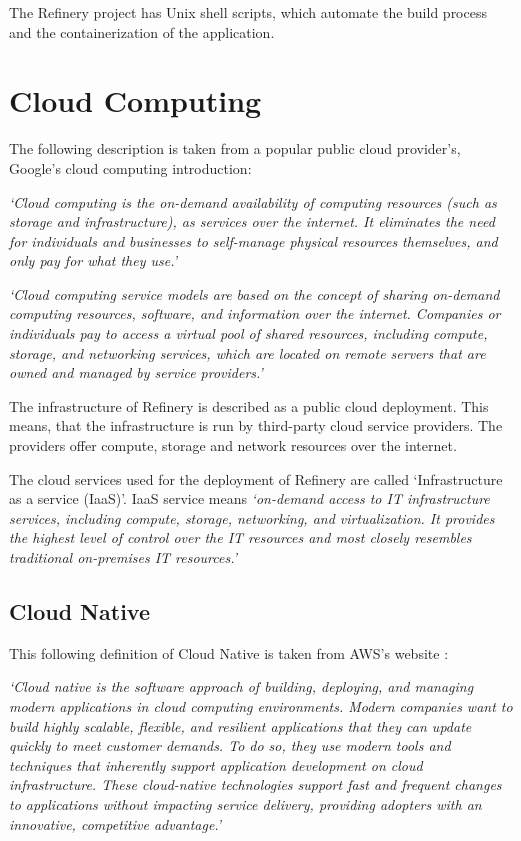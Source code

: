 	The Refinery project has Unix shell scripts, which automate the build process and the containerization of the application.

\section{Cloud Computing} \label{backgrcloud}
	The following description is taken from a popular public cloud provider's, Google's cloud computing introduction:

	\textit{`Cloud computing \cite{cloud} is the on-demand availability of computing resources (such as storage and infrastructure), as services over the internet. 
	It eliminates the need for individuals and businesses to self-manage physical resources themselves, and only pay for what they use.'}

	\textit{`Cloud computing service models are based on the concept of sharing on-demand computing resources, software, and information over the internet. 
	Companies or individuals pay to access a virtual pool of shared resources, including compute, storage, and networking services, which are located on
	remote servers that are owned and managed by service providers.'}

	The infrastructure of Refinery is described as a public cloud deployment. 
	This means, that the infrastructure is run by third-party cloud service providers.
	The providers offer compute, storage and network resources over the internet. 

	The cloud services used for the deployment of Refinery are called `Infrastructure as a service (IaaS)'.
	IaaS service means \cite{cloud} \textit{`on-demand access to IT infrastructure services, 
		including compute, storage, networking, and virtualization. It provides the highest level of control over the IT 
		resources and most closely resembles traditional on-premises IT resources.'}

	\subsection{Cloud Native} \label{backgrcloudnative}
		This following definition of Cloud Native is taken from AWS's website \cite{cloudnative}:

		\textit{
			`Cloud native is the software approach of building, deploying, and managing modern applications 
			in cloud computing environments. Modern companies want to build highly scalable, flexible, and 
			resilient applications that they can update quickly to meet customer demands. 
			To do so, they use modern tools and techniques that inherently support application
			development on cloud infrastructure. These cloud-native technologies support fast 
			and frequent changes to applications without impacting service delivery, providing
			adopters with an innovative, competitive advantage.'
		}

